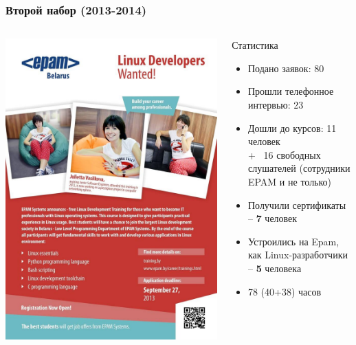\begin{frame}
\frametitle{Второй набор (2013-2014)}

  \begin{columns}


	\includegraphics[width=\textwidth]{linux_courses_epam}

	  \begin{block}{Статистика}
		\begin{itemize}
		  \item Подано заявок: 80
		  \item Прошли телефонное интервью: 23
		  \item Дошли до курсов: 11 человек \\ + ~16 свободных слушателей (сотрудники EPAM и не только)
  		  \item Получили сертификаты -- {\bf 7} человек
		  \item Устроились на Epam, как Linux-разработчики -- {\bf 5} человека
          \item 78 (40+38) часов
		\end{itemize}
	  \end{block}
  \end{columns}
\end{frame}


